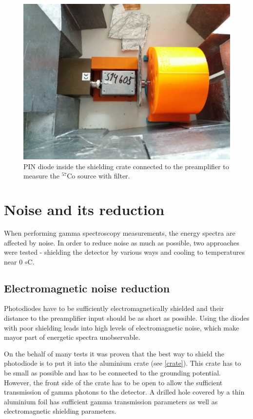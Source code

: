 \begin{figure}[H]
 \centering
 \includegraphics[scale=0.09, angle = 0]{./pictures/ORTECsetup.jpg}
 \caption{PIN diode inside the shielding crate connected to the preamplifier to measure the $^{57}$Co source with filter.}
 \label{setup}
 
\end{figure}


\section{Noise and its reduction}
When performing gamma spectroscopy measurements, the energy spectra are affected by noise. In order to reduce noise as much as possible, two approaches were tested - shielding the detector by various ways and cooling to temperatures near 0 $\circ$C.
\subsection{Electromagnetic noise reduction}
Photodiodes have to be sufficiently electromagnetically shielded and their distance to the preamplifier input should be as short as possible. Using the diodes with poor shielding leads into high levels of electromagnetic noise, which make mayor part of energetic spectra unobservable.
\par
On the behalf of many tests it was proven that the best way to shield the photodiode is to put it into the aluminium crate (see \ref{crate}). This crate has to be small as possible and has to be connected to the grounding potential. However, the front side of the crate has to be open to allow the sufficient transmission of gamma photons to the detector. A drilled hole covered by a thin aluminium foil has sufficient gamma transmission parameters as well as electromagnetic shielding parameters.

